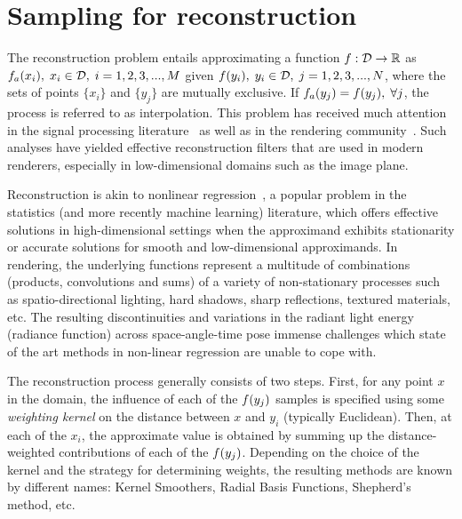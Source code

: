 \documentclass[11pt,fleqn]{book} %
\newcommand{\TBC} {}
\begin{document}
\TBC 



\chapter{Sampling for reconstruction}
The reconstruction problem entails approximating a function $f:\mathcal{D}\rightarrow\mathbb{R}$ as ${f}_a(x_i), \; x_i\in\mathcal{D}, \;i=1,2,3,...,M$ given $f(y_i), \; y_i \in \mathcal{D}, \;j=1,2,3,...,N$, where the sets of points $\{x_i\}$ and $\{y_j\}$ are mutually exclusive. If ${f}_a(y_j) = f(y_j),\;\forall j$, the process is referred to as interpolation. This problem has received much attention in the signal processing literature~\cite[chapters~5~\&~6]{engineering2008handbook} as well as in the rendering community~\cite{Wold85,Cook:1986:SSC,mitchell87a,journals/cga/Blinn89a}. Such analyses have yielded effective reconstruction filters that are used in modern renderers, especially in low-dimensional domains such as the image plane.

Reconstruction is akin to nonlinear regression~\cite{GVK394929411}, a popular problem in the statistics (and more recently machine learning) literature, which offers effective solutions in high-dimensional settings when the approximand exhibits stationarity or accurate solutions for smooth and low-dimensional approximands. In rendering, the underlying functions represent a multitude of combinations (products, convolutions and sums) of a variety of non-stationary processes such as spatio-directional lighting, hard shadows, sharp reflections, textured materials, etc. The resulting discontinuities and variations in the radiant light energy (radiance function) across space-angle-time pose immense challenges which state of the art methods in non-linear regression are unable to cope with.

The reconstruction process generally consists of two steps. First, for any point $x$ in the domain, the influence of each of the $f(y_j)$ samples is specified using some \textit{weighting kernel} on the distance between $x$ and $y_i$ (typically Euclidean). Then, at each of the $x_i$, the approximate value is obtained by summing up the distance-weighted contributions of each of the $f(y_j)$. Depending on the choice of the kernel and the strategy for determining weights, the resulting methods are known by different names: Kernel Smoothers, Radial Basis Functions, Shepherd's method, etc.  
\end{document}

